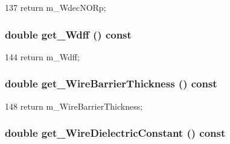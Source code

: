 \begin{DoxyCode}
137 { return m_WdecNORp; }
\end{DoxyCode}
\hypertarget{classTechParameter_a861cfe465f1df26c66ff4075f4935870}{
\subsubsection[{get\_\-Wdff}]{\setlength{\rightskip}{0pt plus 5cm}double get\_\-Wdff () const}}
\label{classTechParameter_a861cfe465f1df26c66ff4075f4935870}



\begin{DoxyCode}
144 { return m_Wdff; }
\end{DoxyCode}
\hypertarget{classTechParameter_a705db86cf613cea77401a067b08fcb43}{
\subsubsection[{get\_\-WireBarrierThickness}]{\setlength{\rightskip}{0pt plus 5cm}double get\_\-WireBarrierThickness () const}}
\label{classTechParameter_a705db86cf613cea77401a067b08fcb43}



\begin{DoxyCode}
148 { return m_WireBarrierThickness; }
\end{DoxyCode}
\hypertarget{classTechParameter_af0f67ba9e156d60b46f1d83cc6d810d0}{
\subsubsection[{get\_\-WireDielectricConstant}]{\setlength{\rightskip}{0pt plus 5cm}double get\_\-WireDielectricConstant () const}}
\label{classTechParameter_af0f67ba9e156d60b46f1d83cc6d810d0}



